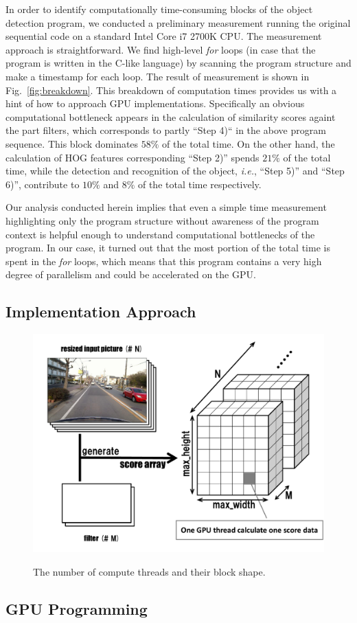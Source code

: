 In order to identify computationally time-consuming blocks of the object
detection program, we conducted a preliminary measurement running the
original sequential code \cite{Niknejad12} on a standard Intel Core i7
2700K CPU.
The measurement approach is straightforward.
We find high-level \textit{for} loops (in case that the program is
written in the C-like language) by scanning the program structure and
make a timestamp for each loop.
The result of measurement is shown in Fig.~\ref{fig:breakdown}.
This breakdown of computation times provides us with a hint of how to
approach GPU implementations.
Specifically an obvious computational bottleneck appears in the
calculation of similarity scores againt the part filters, which
corresponds to partly ``Step 4)`` in the above program sequence.
This block dominates $58\%$ of the total time.
On the other hand, the calculation of HOG features corresponding ``Step
2)'' spends $21\%$ of the total time, while the detection and recognition
of the object, \textit{i.e.}, ``Step 5)'' and ``Step 6)'', contribute to
$10\%$ and $8\%$ of the total time respectively.

Our analysis conducted herein implies that even a simple time
measurement highlighting only the program structure without awareness of
the program context is helpful enough to understand computational
bottlenecks of the program.
In our case, it turned out that the most portion of the total time is
spent in the \textit{for} loops, which means that this program contains
a very high degree of parallelism and could be accelerated on the GPU.

\subsection{Implementation Approach}

\begin{figure}[t]
 \begin{center}
  \includegraphics[width=\hsize]{fig/threads_shape.pdf}\\
  \caption{The number of compute threads and their block shape.}
  \label{fig:threads_shape}
 \end{center}
\end{figure}

\subsection{GPU Programming}